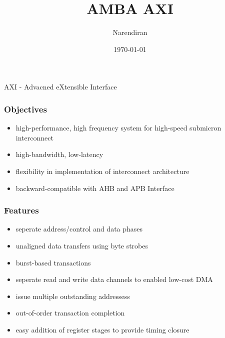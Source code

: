\documentclass{article}
\title{AMBA AXI}
\author{Narendiran}
\date{\today}
\begin{document}
\large
\maketitle

\quad AXI - Advacned eXtensible Interface
\subsubsection{Objectives}
\begin{itemize}
    \item high-performance, high frequency system for high-speed submicron interconnect
    \item high-bandwidth, low-latency
    \item flexibility in implementation of interconnect architecture
    \item backward-compatible with AHB and APB Interface
\end{itemize}
\subsubsection{Features}
\begin{itemize}
    \item seperate address/control and data phases
    \item unaligned data transfers using byte strobes
    \item burst-based transactions
    \item seperate read and write data channels to enabled low-cost DMA
    \item issue multiple outstanding addressess
    \item out-of-order transaction completion
    \item easy addition of register stages to provide timing closure
\end{itemize}
\end{document}
